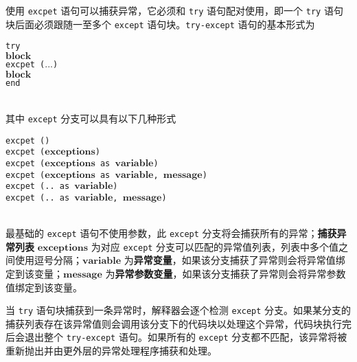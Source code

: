 使用 \texttt{excpet} 语句可以捕获异常，它必须和 \texttt{try} 语句配对使用，即一个 \texttt{try} 语句块后面必须跟随一至多个 \texttt{except} 语句块。\texttt{try-except} 语句的基本形式为
\begin{algorithm}
    \texttt{try} \\
        \qquad $\bm{block}$ \\
    \texttt{excpet (}$\bm{...}$\texttt{)} \\
        \qquad $\bm{block}$ \\
    \texttt{end}
\end{algorithm}\vspace{-0.6em}\\
其中 \texttt{except} 分支可以具有以下几种形式
\begin{algorithm}
    \texttt{excpet ()} \\
    \texttt{excpet (}$\bm{exceptions}$\texttt{)} \\
    \texttt{excpet (}$\bm{exceptions}$\texttt{ as }$\bm{variable}$\texttt{)} \\
    \texttt{excpet (}$\bm{exceptions}$\texttt{ as }$\bm{variable}$\texttt{, }$\bm{message}$\texttt{)} \\ 
    \texttt{excpet (.. as }$\bm{variable}$\texttt{)} \\
    \texttt{excpet (.. as }$\bm{variable}$\texttt{, }$\bm{message}$\texttt{)} \\
\end{algorithm}\vspace{-0.6em}\\
最基础的 \texttt{except} 语句不使用参数，此 \texttt{except} 分支将会捕获所有的异常；\textbf{捕获异常列表} $\bm{exceptions}$ 为对应 \texttt{except} 分支可以匹配的异常值列表，列表中多个值之间使用逗号分隔；$\bm{variable}$ 为\textbf{异常变量}，如果该分支捕获了异常则会将异常值绑定到该变量；$\bm{message}$ 为\textbf{异常参数变量}，如果该分支捕获了异常则会将异常参数值绑定到该变量。

当 \texttt{try} 语句块捕获到一条异常时，解释器会逐个检测 \texttt{except} 分支。如果某分支的捕获列表存在该异常值则会调用该分支下的代码块以处理这个异常，代码块执行完后会退出整个 \texttt{try-except} 语句。如果所有的 \texttt{except} 分支都不匹配，该异常将被重新抛出并由更外层的异常处理程序捕获和处理。
